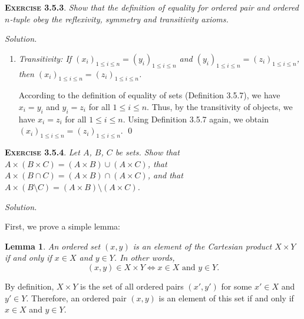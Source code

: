 \documentclass[12pt]{article}
\newtheorem*{lemma}{Lemma}
\theoremstyle{remark}
\newenvironment{exer}[2]{
    \noindent \setlength{\parskip}{1em}%
    \textsc{\textbf{Exercise #1}}. \textit{#2} \par
    \noindent \textit{Solution.} %
}{\bigskip}
\begin{document}
\begin{exer}{3.5.3}{
    Show that the definition of equality for ordered pair and ordered $n$-tuple obey the reflexivity, symmetry and transitivity axioms.
}
\begin{enumerate}[topsep=0mm,label=(\alph*)]
        \item \textit{Transitivity: If $(x_i)_{1 \le i \le n} = (y_i)_{1 \le i \le n}$ and $(y_i)_{1 \le i \le n} = (z_i)_{1 \le i \le n}$, then $(x_i)_{1 \le i \le n} = (z_i)_{1 \le i \le n}$.}

            According to the definition of equality of sets (Definition 3.5.7), we have $x_i = y_i$ and $y_i = z_i$ for all $1 \le i \le n$.
            Thus, by the transitivity of objects, we have $x_i = z_i$ for all $1 \le i \le n$.
            Using Definition 3.5.7 again, we obtain $(x_i)_{1 \le i \le n} = (z_i)_{1 \le i \le n}$. \qed
    \end{enumerate}    
\end{exer}


\begin{exer}{3.5.4}{
    Let $A$, $B$, $C$ be sets.
    Show that $A \times (B \times C) = (A \times B) \cup (A \times C)$,
    that $A \times (B \cap C) = (A \times B) \cap (A \times C)$,
    and that $A \times (B \setminus C) = (A \times B) \setminus (A \times C)$.
}
    First, we prove a simple lemma:
    \begin{lemma}
        An ordered set $(x, y)$ is an element of the Cartesian product $X \times Y$ if and only if $x \in X$ and $y \in Y$. In other words,
        \[
            (x, y) \in X \times Y \iff x \in X \text{ and } y \in Y.
        \]
    \end{lemma}
    \begin{prf}
        By definition, $X \times Y$ is the set of all ordered pairs $(x', y')$ for some $x' \in X$ and $y' \in Y$.
        Therefore, an ordered pair $(x, y)$ is an element of this set if and only if $x \in X$ and $y \in Y$.
    \end{prf}
    

\end{exer}
\end{document}
